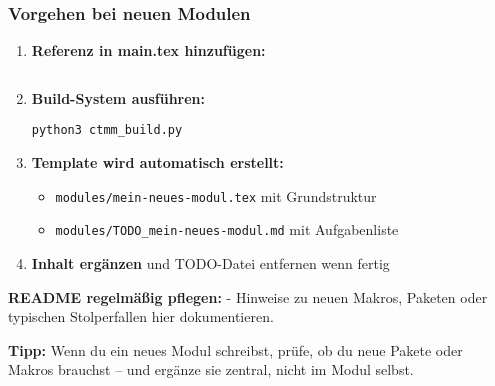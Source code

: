 \hypertarget{vorgehen-bei-neuen-modulen}{%
\subsubsection{Vorgehen bei neuen Modulen}\label{vorgehen-bei-neuen-modulen}}

\begin{enumerate}
\def\labelenumi{\arabic{enumi}.}
\item
  \textbf{Referenz in main.tex hinzufügen:}

\begin{verbatim}

\end{verbatim}
\item
  \textbf{Build-System ausführen:}

\begin{verbatim}
python3 ctmm_build.py
\end{verbatim}
\item
  \textbf{Template wird automatisch erstellt:}

  \begin{itemize}
  \tightlist
  \item
    \texttt{modules/mein-neues-modul.tex} mit Grundstruktur
  \item
    \texttt{modules/TODO\_mein-neues-modul.md} mit Aufgabenliste
  \end{itemize}
\item
  \textbf{Inhalt ergänzen} und TODO-Datei entfernen wenn fertig
\end{enumerate}

\textbf{README regelmäßig pflegen:} - Hinweise zu neuen Makros, Paketen oder typischen Stolperfallen hier dokumentieren.

\textbf{Tipp:} Wenn du ein neues Modul schreibst, prüfe, ob du neue Pakete oder Makros brauchst -- und ergänze sie zentral, nicht im Modul selbst.
